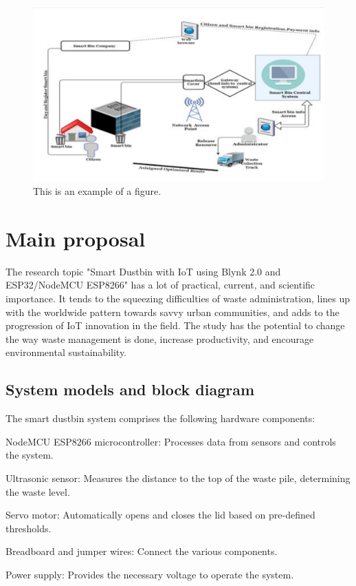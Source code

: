\documentclass[conference, onecolumn]{IEEEtran}
\begin{document}
\begin{figure}[htbp]
\centerline{\includegraphics[width=3.8 in]{figure.png}}
\caption{This is an example of a figure.}
\label{fig}
\end{figure}

\section{Main proposal}
The research topic "Smart Dustbin with IoT using Blynk 2.0 and ESP32/NodeMCU ESP8266" has a lot of practical, current, and scientific importance. It tends to the squeezing difficulties of waste administration, lines up with the worldwide pattern towards savvy urban communities, and adds to the progression of IoT innovation in the field. The study has the potential to change the way waste management is done, increase productivity, and encourage environmental sustainability.\\

\subsection{System models and block diagram}

The smart dustbin system comprises the following hardware components:

NodeMCU ESP8266 microcontroller: Processes data from sensors and controls the system.

Ultrasonic sensor: Measures the distance to the top of the waste pile, determining the waste level.

Servo motor: Automatically opens and closes the lid based on pre-defined thresholds.

Breadboard and jumper wires: Connect the various components.

Power supply: Provides the necessary voltage to operate the system.\\
\end{document}
